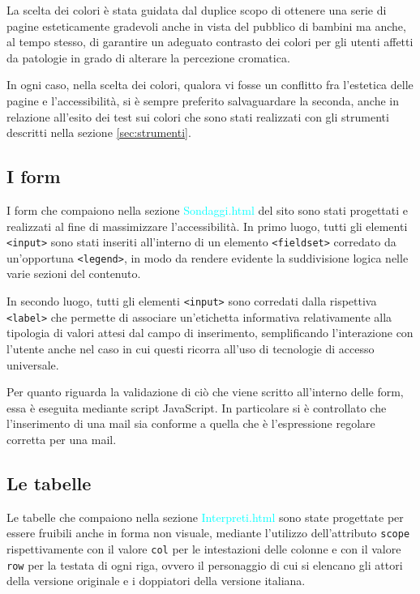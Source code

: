 \documentclass[10pt,a4paper,onecolumn]{article}
\newcommand{\sitepage}[1]{\textcolor{cyan}{\textsf{#1}}}
\begin{document}
La scelta dei colori è stata guidata dal duplice scopo di ottenere una serie di pagine esteticamente gradevoli anche in vista del pubblico di bambini ma anche, al tempo stesso, di garantire un adeguato contrasto dei colori per gli utenti affetti da patologie in grado di alterare la percezione cromatica.

In ogni caso, nella scelta dei colori, qualora vi fosse un conflitto fra l'estetica delle pagine e l'accessibilità, si è sempre preferito salvaguardare la seconda, anche in relazione all'esito dei test sui colori che sono stati realizzati con gli strumenti descritti nella sezione \ref{sec:strumenti}.

\subsection{I form}
I form che compaiono nella sezione \sitepage{Sondaggi.html} del sito sono stati progettati e realizzati al fine di massimizzare l'accessibilità. In primo luogo, tutti gli elementi \texttt{<input>} sono stati inseriti all'interno di un elemento \texttt{<fieldset>} corredato da un'opportuna \texttt{<legend>}, in modo da rendere evidente la suddivisione logica nelle varie sezioni del contenuto.

In secondo luogo, tutti gli elementi \texttt{<input>} sono corredati dalla rispettiva \texttt{<label>} che permette di associare un'etichetta informativa relativamente alla tipologia di valori attesi dal campo di inserimento, semplificando l'interazione con l'utente anche nel caso in cui questi ricorra all'uso di tecnologie di accesso universale.

Per quanto riguarda la validazione di ciò che viene scritto all'interno delle form, essa è eseguita mediante script JavaScript. In particolare si è controllato che l'inserimento di una mail sia conforme a quella che è l'espressione regolare corretta per una mail.


\subsection{Le tabelle}
Le tabelle che compaiono nella sezione \sitepage{Interpreti.html} sono state progettate per essere fruibili anche in forma non visuale, mediante l'utilizzo dell'attributo \texttt{scope} rispettivamente con il valore \texttt{col} per le intestazioni delle colonne e con il valore \texttt{row} per la testata di ogni riga, ovvero il personaggio di cui si elencano gli attori della versione originale e i doppiatori della versione italiana.
\end{document}

